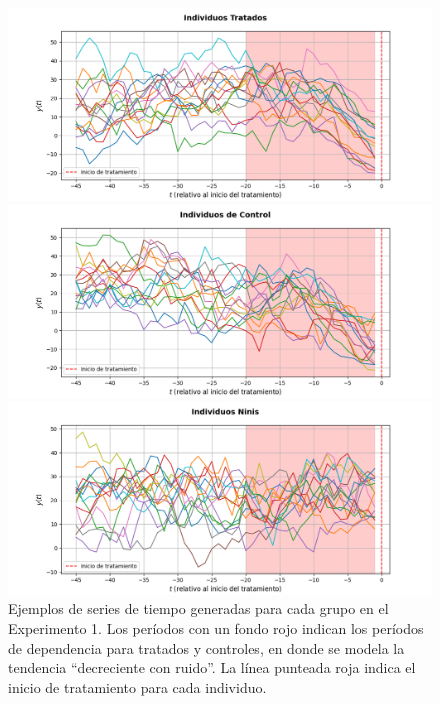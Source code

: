 \documentclass[../../main.tex]{subfiles}
\begin{document}
\begin{figure}[H]
    \centering
    \begin{minipage}{0.48\textwidth}
        \centering
        \includegraphics[scale=0.3]{figs/Exp1/plot_time_series_Tratados.png}
    \end{minipage}
    \hfill
    \begin{minipage}{0.48\textwidth}
        \centering
        \includegraphics[scale=0.3]{figs/Exp1/plot_time_series_de_Control.png}
    \end{minipage}
    \vspace{0.5em}
    \begin{minipage}{0.6\textwidth}
        \centering
        \includegraphics[scale=0.3]{figs/Exp1/plot_time_series_Ninis.png}
    \end{minipage}
    \caption{Ejemplos de series de tiempo generadas para cada grupo en el Experimento 1.
    Los períodos con un fondo rojo indican los períodos de dependencia para tratados y
    controles, en donde se modela la tendencia ``decreciente con ruido''. La línea
    punteada roja indica el inicio de tratamiento para cada individuo.}
    \label{fig:time_series_exp1}
\end{figure}
\end{document}
